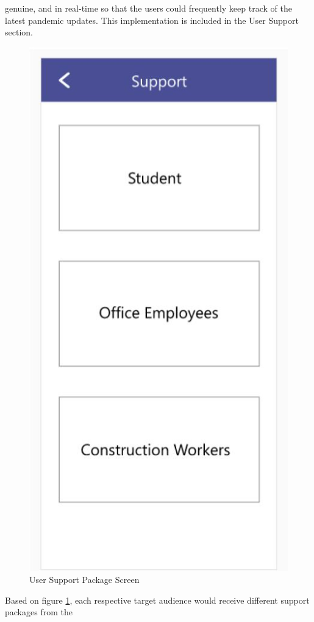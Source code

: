 \begin{enumerate}[a)]
          genuine, and in real-time so that the users could frequently keep track of the latest pandemic updates.
          This implementation is included in the User Support section.
          \begin{figure}[H]
            \centering
            \includegraphics[scale=1]{img/prototype/iter3-proto-6.png}
            \caption{User Support Package Screen}
            \label{fig:iter3-proto-6}
          \end{figure} 
          \par Based on figure \ref{fig:iter3-proto-6}, each respective target audience would receive different support packages from the

\end{enumerate}
